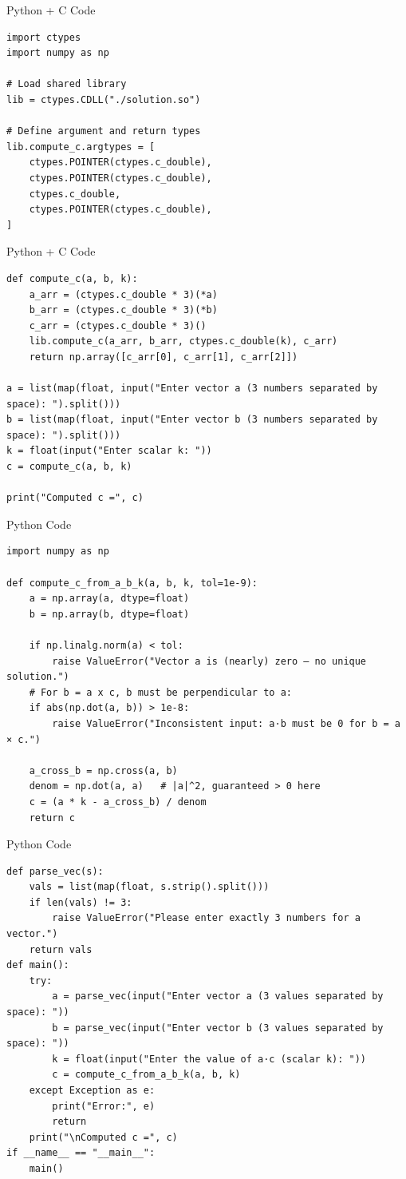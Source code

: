 \documentclass{beamer}
\begin{document}
\begin{frame}[fragile]{Python + C Code}
    \begin{verbatim}
import ctypes
import numpy as np

# Load shared library
lib = ctypes.CDLL("./solution.so")

# Define argument and return types
lib.compute_c.argtypes = [
    ctypes.POINTER(ctypes.c_double),
    ctypes.POINTER(ctypes.c_double),
    ctypes.c_double,
    ctypes.POINTER(ctypes.c_double),
]
\end{verbatim}
\end{frame}

\begin{frame}[fragile]{Python + C Code}
    \begin{verbatim}
def compute_c(a, b, k):
    a_arr = (ctypes.c_double * 3)(*a)
    b_arr = (ctypes.c_double * 3)(*b)
    c_arr = (ctypes.c_double * 3)()
    lib.compute_c(a_arr, b_arr, ctypes.c_double(k), c_arr)
    return np.array([c_arr[0], c_arr[1], c_arr[2]])

a = list(map(float, input("Enter vector a (3 numbers separated by space): ").split()))
b = list(map(float, input("Enter vector b (3 numbers separated by space): ").split()))
k = float(input("Enter scalar k: "))
c = compute_c(a, b, k)

print("Computed c =", c)
    \end{verbatim}
\end{frame}

\begin{frame}[fragile]{Python Code}
    \begin{verbatim}
import numpy as np

def compute_c_from_a_b_k(a, b, k, tol=1e-9):
    a = np.array(a, dtype=float)
    b = np.array(b, dtype=float)

    if np.linalg.norm(a) < tol:
        raise ValueError("Vector a is (nearly) zero — no unique solution.")
    # For b = a x c, b must be perpendicular to a:
    if abs(np.dot(a, b)) > 1e-8:
        raise ValueError("Inconsistent input: a·b must be 0 for b = a × c.")

    a_cross_b = np.cross(a, b)
    denom = np.dot(a, a)   # |a|^2, guaranteed > 0 here
    c = (a * k - a_cross_b) / denom
    return c
    \end{verbatim}
\end{frame}

\begin{frame}[fragile]{Python Code}
    \begin{verbatim}
def parse_vec(s):
    vals = list(map(float, s.strip().split()))
    if len(vals) != 3:
        raise ValueError("Please enter exactly 3 numbers for a vector.")
    return vals
def main():
    try:
        a = parse_vec(input("Enter vector a (3 values separated by space): "))
        b = parse_vec(input("Enter vector b (3 values separated by space): "))
        k = float(input("Enter the value of a·c (scalar k): "))
        c = compute_c_from_a_b_k(a, b, k)
    except Exception as e:
        print("Error:", e)
        return
    print("\nComputed c =", c)
if __name__ == "__main__":
    main()
    \end{verbatim}
\end{frame}
\end{document}
